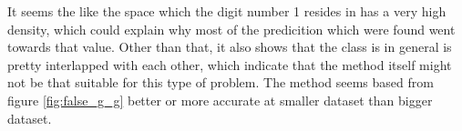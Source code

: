 \documentclass[10pt,a4paper]{article}
\begin{document}
It seems the like the space which the digit number 1 resides in has a very high density, which could explain why most of the predicition which were found went towards that value. 
Other than that, it also shows that the class is in general is pretty interlapped with each other, which indicate that the method itself might not be that suitable for this type of problem.  The method seems based from figure \ref{fig:false_g_g} better or more accurate at smaller dataset than bigger dataset. 
\end{document}
